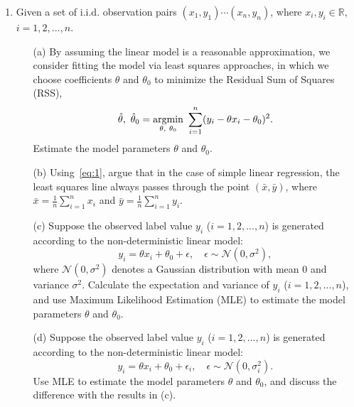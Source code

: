 \documentclass[10pt]{article}
\begin{document}
\begin{enumerate}[1.]
	\item  Given a set of i.i.d. observation pairs $(x_{1},y_{1})\cdots(x_{n},y_{n})$, where $x_i, y_i \in \mathbb{R}$, $i=1,2,...,n$.
	      \begin{itemize}
		      \item[(a)] By assuming the linear model is a reasonable approximation, we consider fitting the model via least squares approaches,
		            in which we choose coefficients $\theta$ and $\theta_0$ to minimize the Residual Sum of Squares (RSS),
		            \begin{equation}\label{eq:1}
			            \hat{\theta},~ \hat{\theta}_0 = \mathop{\rm argmin}_{\theta,~ \theta_0}~ \sum_{i=1}^{n}(y_{i} -\theta x_{i}-\theta_0)^{2}.
		            \end{equation}
		            Estimate the model parameters $\theta$ and $\theta_0$. ~
		      \item[(b)] Using~\eqref{eq:1}, argue that in the case of simple linear regression, the least squares line always passes through the point $(\bar{x},\bar{y})$,
		            where $\bar{x} = \tfrac{1}{n}\sum_{i=1}^{n}x_{i}$ and $\bar{y} = \tfrac{1}{n}\sum_{i=1}^{n} y_{i}$. ~
		      \item[(c)] Suppose the observed label value $y_i$ ($i=1,2,...,n$) is generated according to the non-deterministic linear model:
		            \begin{equation}
			            y_i = \theta x_i + \theta_0 + \epsilon, \quad \epsilon \sim \mathcal{N}(0,\sigma^2),
		            \end{equation}
		            where $\mathcal{N}(0,\sigma^2)$ denotes a Gaussian distribution with mean 0 and variance $\sigma^2$.
		            Calculate the expectation and variance of $y_i$ ($i=1,2,...,n$), and
		            use Maximum Likelihood Estimation (MLE) to estimate the model parameters $\theta$ and $\theta_0$. ~
		      \item[(d)] Suppose the observed label value $y_i$ ($i=1,2,...,n$) is generated according to the non-deterministic linear model:
		            \begin{equation}
			            y_i = \theta x_i + \theta_0 + \epsilon_i, \quad \epsilon \sim \mathcal{N}(0,\sigma_i^2).
		            \end{equation}
		            Use MLE to estimate the model parameters $\theta$ and $\theta_0$, and discuss the difference with the results in (c). ~
	      \end{itemize}



\end{enumerate}
\end{document}
